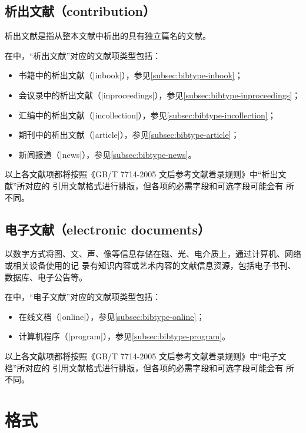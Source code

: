 \subsection{析出文献（contribution）}

析出文献是指从整本文献中析出的具有独立篇名的文献。 

在{\njuthesis}中，“析出文献”对应的{\BibTeX}文献项类型包括：
\begin{itemize}
\item 书籍中的析出文献（|inbook|），参见\ref{subsec:bibtype-inbook}；
\item 会议录中的析出文献（|inproceedings|），参见\ref{subsec:bibtype-inproceedings}；
\item 汇编中的析出文献（|incollection|），参见\ref{subsec:bibtype-incollection}；
\item 期刊中的析出文献（|article|），参见\ref{subsec:bibtype-article}；
\item 新闻报道（|news|），参见\ref{subsec:bibtype-news}。
\end{itemize}

以上各文献项都将按照《GB/T 7714-2005 文后参考文献着录规则》中“析出文献”所对应的
引用文献格式进行排版\cite{gbt7714-2005}，但各项的必需字段和可选字段可能会有
所不同。

\subsection{电子文献（electronic documents）}

以数字方式将图、文、声、像等信息存储在磁、光、电介质上，通过计算机、网络或相关设备使用的记
录有知识内容或艺术内容的文献信息资源，包括电子书刊、数据库、电子公告等。

在{\njuthesis}中，“电子文献”对应的{\BibTeX}文献项类型包括：
\begin{itemize}
\item 在线文档（|online|），参见\ref{subsec:bibtype-online}；
\item 计算机程序（|program|），参见\ref{subsec:bibtype-program}。
\end{itemize}

以上各文献项都将按照《GB/T 7714-2005 文后参考文献着录规则》中“电子文档”所对应的
引用文献格式进行排版\cite{gbt7714-2005}，但各项的必需字段和可选字段可能会有
所不同。

\section{格式}\label{sec:bib-format}

